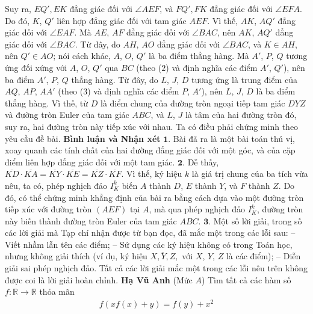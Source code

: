 \begin{multicols}{2}
	Suy ra, $EQ', EK$ đẳng giác đối với $\angle AEF$, và $FQ', FK$ đẳng giác đối với $\angle EFA$. Do đó, $K$, $Q'$ liên hợp đẳng giác đối với tam giác $AEF$. Vì thế, $AK$, $AQ'$ đẳng giác đối với $\angle EAF$.  Mà $AE$, $AF$ đẳng giác đối với $\angle BAC$,  nên $AK$, $AQ'$ đẳng giác đối với $\angle BAC$. Từ đây, do $AH$, $AO$ đẳng giác đối với $\angle BAC$, và $K \in  AH$, nên  $Q' \in AO$; nói cách khác, $A$, $O$, $Q'$ là ba điểm thẳng hàng. Mà  $A'$, $P$, $Q$ tương ứng đối xứng với $A$, $O$, $Q'$ qua $BC$ (theo ($2$) và định nghĩa các điểm  $A'$, $Q'$), nên ba điểm  $A'$, $P$, $Q$  thẳng hàng. Từ đây, do $L$, $J$, $D$ tương ứng là trung điểm của $AQ$, $AP$, $AA'$ (theo ($3$) và định nghĩa các điểm $P$,  $A'$), nên $L$, $J$, $D$ là ba điểm thẳng hàng. Vì thế, từ $D$ là điểm chung của đường tròn ngoại tiếp tam giác $DYZ$ và đường tròn Euler của tam giác $ABC$, và $L$, $J$ là tâm của hai đường tròn đó, suy ra, hai đường tròn này tiếp xúc với nhau. Ta có điều phải chứng minh theo yêu cầu đề bài.
	\vskip 0.05cm
	\textbf{\color{thachthuctoanhoc}Bình luận và Nhận xét}
	\vskip 0.05cm
	$\pmb{1.}$ Bài đã ra là một bài toán thú vị, xoay quanh các tính chất của hai đường đẳng giác đối với một góc, và của cặp điểm liên hợp đẳng giác đối với một tam giác.
	\vskip 0.05cm
	$\pmb{2.}$ Dễ thấy, $\overline {KD}  \cdot \overline {KA}  = \overline {KY}  \cdot \overline {KE}  = \overline {KZ}  \cdot \overline {KF}$. Vì thế, ký hiệu $k$ là giá trị chung của ba tích vừa nêu, ta có, phép nghịch đảo $I_K^k$  biến $A$ thành $D$, $E$ thành $Y$, và $F$ thành $Z$. Do đó, có thể chứng minh khẳng định của bài ra bằng cách dựa vào một đường tròn tiếp xúc với đường tròn $(AEF)$ tại $A$, mà qua phép nghịch đảo $I_K^k$, đường tròn này biến thành đường tròn Euler của tam giác $ABC$.
	\vskip 0.05cm
	$\pmb{3.}$ Một số lời giải, trong số các lời giải mà Tạp chí nhận được từ bạn đọc, đã mắc một trong các lỗi sau:
	\vskip 0.05cm
	-- Viết nhầm lẫn tên các điểm;
	\vskip 0.05cm
	-- Sử dụng các ký hiệu không có trong Toán học, nhưng không giải thích (ví dụ, ký hiệu $\overline {X,Y,Z} ,$ với $X$, $Y$, $Z$ là các điểm);
	\vskip 0.05cm
	-- Diễn giải sai phép nghịch đảo.
	\vskip 0.05cm
	Tất cả các lời giải mắc một trong các lỗi nêu trên không được coi là lời giải hoàn chỉnh.
	\vskip 0.05cm
	\hfill	\textbf{\color{thachthuctoanhoc}Hạ Vũ Anh}
	\vskip 0.05cm
	{}
	(Mức $A$) Tìm tất cả các hàm số \linebreak $f: \mathbb{R} \rightarrow \mathbb{R}$ thỏa mãn
	\begin{align*}
		f(x f(x)+y)=f(y)+x^{2}

\end{align*}
\end{multicols}
